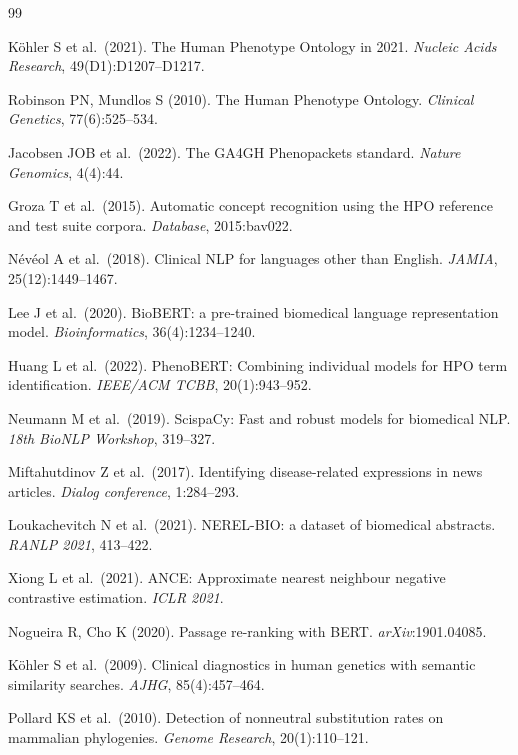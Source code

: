 \documentclass[11pt,a4paper]{article}
\begin{document}

\begin{thebibliography}{99}

K\"ohler S et al.\ (2021).
The Human Phenotype Ontology in 2021.
\textit{Nucleic Acids Research}, 49(D1):D1207--D1217.

Robinson PN, Mundlos S (2010).
The Human Phenotype Ontology.
\textit{Clinical Genetics}, 77(6):525--534.

Jacobsen JOB et al.\ (2022).
The GA4GH Phenopackets standard.
\textit{Nature Genomics}, 4(4):44.

Groza T et al.\ (2015).
Automatic concept recognition using the HPO reference and test suite corpora.
\textit{Database}, 2015:bav022.

N\'ev\'eol A et al.\ (2018).
Clinical NLP for languages other than English.
\textit{JAMIA}, 25(12):1449--1467.

Lee J et al.\ (2020).
BioBERT: a pre-trained biomedical language representation model.
\textit{Bioinformatics}, 36(4):1234--1240.

Huang L et al.\ (2022).
PhenoBERT: Combining individual models for HPO term identification.
\textit{IEEE/ACM TCBB}, 20(1):943--952.

Neumann M et al.\ (2019).
ScispaCy: Fast and robust models for biomedical NLP.
\textit{18th BioNLP Workshop}, 319--327.

Miftahutdinov Z et al.\ (2017).
Identifying disease-related expressions in news articles.
\textit{Dialog conference}, 1:284--293.

Loukachevitch N et al.\ (2021).
NEREL-BIO: a dataset of biomedical abstracts.
\textit{RANLP 2021}, 413--422.

Xiong L et al.\ (2021).
ANCE: Approximate nearest neighbour negative contrastive estimation.
\textit{ICLR 2021}.

Nogueira R, Cho K (2020).
Passage re-ranking with BERT.
\textit{arXiv}:1901.04085.

K\"ohler S et al.\ (2009).
Clinical diagnostics in human genetics with semantic similarity searches.
\textit{AJHG}, 85(4):457--464.

Pollard KS et al.\ (2010).
Detection of nonneutral substitution rates on mammalian phylogenies.
\textit{Genome Research}, 20(1):110--121.


\end{thebibliography}
\end{document}
